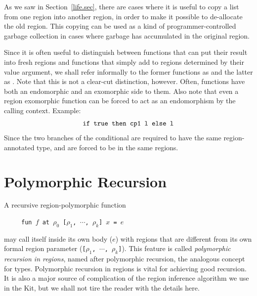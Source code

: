 \documentclass[12pt]{book}
\begin{document}
As we saw in Section~\ref{life.sec}, there are cases where it is useful to copy a list from one region into another region,
in order to make it possible to de-allocate the old region. This copying can be used
as a kind of programmer-controlled garbage collection in cases where garbage has accumulated
in the original region. 

Since it is often useful to distinguish between functions that can
put their result into fresh regions and functions that simply add to
regions determined by their value argument, we shall refer informally
to the former functions as  and the latter as . Note that this is not a clear-cut 
distinction, however. Often, functions have both an endomorphic and an
exomorphic side to them. Also note that even a region exomorphic
function can be forced to act as an endomorphism by the calling
context. Example:
$$\hbox{\tt if true then cp1 l else l}$$
Since the two branches of the conditional are required to have the same region-annotated
type,  and  are forced to be in the same regions.
%
\section{Polymorphic Recursion}
%
\label{polyrec.sec}
A recursive region-polymorphic function
\begin{tabbing}
\ \ \ \ \ \=\tt fun $f$ at $\rho_0$ [$\rho_1$, $\cdots$, $\rho_k$] $x$ = $e$
\end{tabbing}
may call itself inside its own body ($e$) with regions that are different
from its own formal region parameter ({\tt [$\rho_1$, $\cdots$, $\rho_k$]}).
This feature is called {\it polymorphic recursion in regions}, named after
polymorphic recursion, the analogous concept for types.
Polymorphic recursion in regions is vital for achieving good recursion.
It is also a major source of  complication of the region inference algorithm
we use in the Kit, but we shall not tire the reader with the details here.
\end{document}
